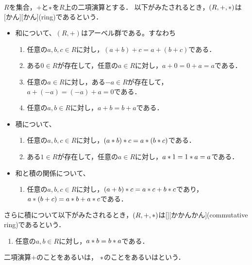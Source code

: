 \documentclass[../sotsu.tex]{subfiles}
\begin{document}
\begin{definition}[環]
    \label{dfn:ring}
    $R$を集合，$+$と$\mathbin{\ast}$を$R$上の二項演算とする．
    以下がみたされるとき，$(R, +, \mathbin{\ast})$は[かん][かん](ring)であるという．
    \begin{itemize}
        \item 和について、$(R, +)$はアーベル群である。すなわち
        \begin{enumerate}
            \item \label{ring:sum-associative} 任意の$a, b, c \in R$に対し，$(a + b) + c = a + (b + c)$である．
            \item \label{ring:sum-zero} ある$0 \in R$が存在して，任意の$a \in R$に対し，$a + 0 = 0 + a = a$である．
            \item \label{ring:sum-opposite} 任意の$a \in R$に対し，ある$-a \in R$が存在して，$a + (-a) = (-a) + a = 0$である．
            \item \label{ring:sum-commutative} 任意の$a, b \in R$に対し，$a + b = b + a$である．
        \end{enumerate}
        \item 積について、
        \begin{enumerate}[resume]
            \item \label{ring:prod-associative} 任意の$a, b, c \in R$に対し，$(a \mathbin{\ast} b) \mathbin{\ast} c = a \mathbin{\ast} (b \mathbin{\ast} c)$である．
            \item \label{ring:prod-one} ある$1 \in R$が存在して，任意の$a \in R$に対し，$a \mathbin{\ast} 1 = 1 \mathbin{\ast} a = a$である．
        \end{enumerate}
        \item 和と積の関係について、
        \begin{enumerate}[resume]
            \item \label{ring:distributive} 任意の$a, b, c \in R$に対し，$(a + b) \mathbin{\ast} c = a \mathbin{\ast} c + b \mathbin{\ast} c$であり，$a \mathbin{\ast} (b + c) = a \mathbin{\ast} b + a \mathbin{\ast} c$である．
        \end{enumerate}
    \end{itemize}
    さらに積について以下がみたされるとき，$(R, +, \mathbin{\ast})$は[][かかんかん](commutative ring)であるという．
    \begin{enumerate}[start=9]
        \item 任意の$a, b \in R$に対し，$a \mathbin{\ast} b = b \mathbin{\ast} a$である．
    \end{enumerate}
    二項演算$+$のことをあるいは，
    $\mathbin{\ast}$のことをあるいはという．
\end{definition}
\end{document}
